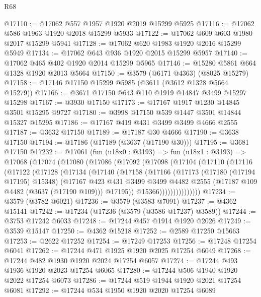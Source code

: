 \begin{lexlean}{R68}
\begin{coremodule}
@17110 := @17062 @557 @1957 @1920 @2019 @15299 @5925
@17116 := @17062 @586 @1963 @1920 @2018 @15299 @5933
@17122 := @17062 @609 @603 @1980 @2017 @15299 @5941
@17128 := @17062 @620 @1983 @1920 @2016 @15299 @5949
@17134 := @17062 @643 @936 @1920 @2015 @15299 @5957
@17140 := @17062 @465 @402 @1920 @2014 @15299 @5965
@17146 := @15280 @5861 @664 @1328 @1920 @2013 @5664
@17150 := @3579 (@6171 @4363) (@8025 @15279)
@17158 := @17146 @17150 @15299 @5985 (@3611 (@3612 @1328 @5664 @15279))
@17166 := @3671 @17150 @643 @110 @1919 @14847 @3499 @15297 @15298
@17167 := @3930 @17150
@17173 := @17167 @1917 @1230 @14845 @3501 @15295 @9727
@17180 := @3998 @17150 @539 @1447 @3501 @14844 @15327 @15295
@17186 := @17167 @419 @431 @3499 @3499 @4666 @2555
@17187 := @3632 @17150
@17189 := @17187 @30 @4666
@17190 := @3638 @17150
@17194 := @17186 (@17189 (@3637 (@17190 @30)))
@17195 := @3681 @17150
@17232 := @17061
    (fun (u18x0 : @3193) =>
    fun (u18x1 : @3193) =>
    @17068
      (@17074
        (@17080
          (@17086
            (@17092
              (@17098
                (@17104
                  (@17110
                    (@17116
                      (@17122
                        (@17128
                          (@17134
                            (@17140
                              (@17158
                                (@17166
                                  (@17173
                                    (@17180 (@17194 @17195) @15348)
                                    (@17167
                                      @423
                                      @431
                                      @3499
                                      @3499
                                      @4482
                                      @2555
                                      (@17187 @109 @4482 (@3637 (@17190 @109)))
                                      @17195))
                                  @15366)))))))))))))))
@17234 := @3579 (@3782 @6021)
@17236 := @3579 (@3583 @7091)
@17237 := @4362 @15141
@17242 := @17234 (@17236 (@3579 (@3586 @17237) @3589))
@17244 := @3753 @17242 @6033
@17248 := @17244 @457 @1914 @1920 @2026
@17249 := @3539 @15147
@17250 := @4362 @15218
@17252 := @2589 @17250 @15663
@17253 := @2622 @17252
@17254 := @17249 @17253
@17256 := @17248 @17254 @6041
@17262 := @17244 @471 @1925 @1920 @2025 @17254 @6049
@17268 := @17244 @482 @1930 @1920 @2024 @17254 @6057
@17274 := @17244 @493 @1936 @1920 @2023 @17254 @6065
@17280 := @17244 @506 @1940 @1920 @2022 @17254 @6073
@17286 := @17244 @519 @1944 @1920 @2021 @17254 @6081
@17292 := @17244 @534 @1950 @1920 @2020 @17254 @6089

\end{coremodule}
\end{lexlean}
